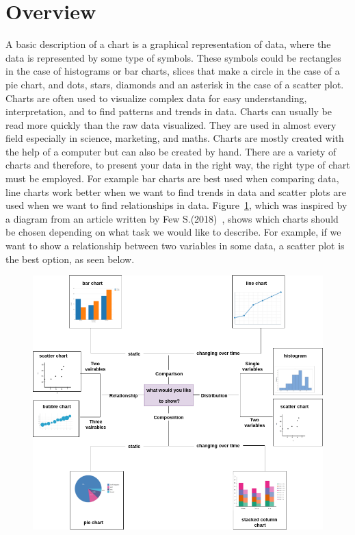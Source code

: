 \documentclass[12pt, a4paper,oneside]{report}
\begin{document}
\section{Overview} 
A basic description of a chart is a graphical representation of data, where the data is represented by some type of symbols. These symbols could be rectangles in the case of histograms or bar charts,  slices that make a circle in the case of a pie chart, and dots, stars, diamonds and an asterisk in the case of a scatter plot. Charts are often used to visualize complex data for easy understanding, interpretation, and to find patterns and trends in data. Charts can usually be read more quickly than the raw data visualized. They are used in almost every field especially in science, marketing, and maths. Charts are mostly created with the help of a computer but can also be created by hand. There are a variety of charts and therefore, to present your data in the right way, the right type of chart must be employed. For example bar charts are best used when comparing data, line charts work better when we want to find trends in data and scatter plots are used when we want to find relationships in data. Figure~\ref{fig:chartse}, which was inspired by a diagram from an article written by Few S.(2018)~\cite{chartselection}, shows which charts should be chosen depending on what task we would like to describe. For example, if we want to show a relationship between two variables in some data, a scatter plot is the best option, as seen below.

\begin{figure}[!htb]
	\centering
	\includegraphics [scale=0.5] {chart}
	\label{fig:chartse}
\end{figure}
\end{document}
